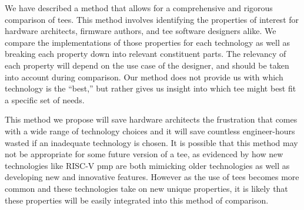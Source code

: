We have described a method that allows for a comprehensive and rigorous comparison of \glspl{tee}. This method involves identifying the properties of interest for hardware architects, firmware authors, and \gls{tee} software designers alike. We compare the implementations of those properties for each technology as well as breaking each property down into relevant constituent parts. The relevancy of each property will depend on the use case of the designer, and should be taken into account during comparison. Our method does not provide us with which technology is the ``best,'' but rather gives us insight into which \gls{tee} might best fit a specific set of needs.

This method we propose will save hardware architects the frustration that comes with a wide range of technology choices and it will save countless engineer-hours wasted if an inadequate technology is chosen. It is possible that this method may not be appropriate for some future version of a \gls{tee}, as evidenced by how new technologies like RISC-V \gls{pmp} are both mimicking older technologies as well as developing new and innovative features. However as the use of \glspl{tee} becomes more common and these technologies take on new unique properties, it is likely that these properties will be easily integrated into this method of comparison.